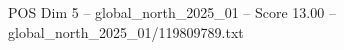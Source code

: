 \begin{textsample}{POS Dim 5 – global\_north\_2025\_01 – Score 13.00 – global\_north\_2025\_01/119809789.txt}
\end{textsample}
